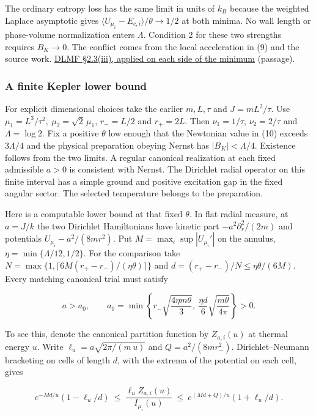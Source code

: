 \documentclass[11pt,a4paper]{article}
\begin{document}
The ordinary entropy loss has the same limit in units of \(k_B\) because
the weighted Laplace asymptotic gives
\(\langle U_{\mu_i}-E_{c,i}\rangle/\theta\to1/2\) at both minima. No
wall length or phase-volume normalization enters \(\Lambda\). Condition
2 for these two strengths requires \(B_K\to0\). The conflict comes from
the local acceleration in (9) and the source work.
\href{https://dlmf.nist.gov/2.3.iii}{DLMF §2.3(iii), applied on each
side of the minimum} (passage).

\subsubsection{A finite Kepler lower
bound}\label{a-finite-kepler-lower-bound}

For explicit dimensional choices take the earlier \(m,L,\tau\) and
\(J=mL^2/\tau\). Use \(\mu_1=L^3/\tau^2,\ \mu_2=\sqrt2\,\mu_1\),
\(r_-=L/2\) and \(r_+=2L\). Then \(\nu_1=1/\tau\), \(\nu_2=2/\tau\) and
\(\Lambda=\log2\). Fix a positive \(\theta\) low enough that the
Newtonian value in (10) exceeds \(3\Lambda/4\) and the physical
preparation obeying Nernst has \(|B_K|<\Lambda/4\). Existence follows
from the two limits. A regular canonical realization at each fixed
admissible \(a>0\) is consistent with Nernst. The Dirichlet radial
operator on this finite interval has a simple ground and positive
excitation gap in the fixed angular sector. The selected temperature
belongs to the preparation.

Here is a computable lower bound at that fixed \(\theta\). In flat
radial measure, at \(a=J/k\) the two Dirichlet Hamiltonians have kinetic
part \(-a^2\partial_r^2/(2m)\) and potentials \(U_{\mu_i}-a^2/(8mr^2)\).
Put \(M=\max_i\sup|U_{\mu_i}'|\) on the annulus,
\(\eta=\min\{\Lambda/12,1/2\}\). For the comparison take
\(N=\max\{1,\lceil 6M(r_+-r_-)/(\eta\theta)\rceil\}\) and
\(d=(r_+-r_-)/N\le\eta\theta/(6M)\). Every matching canonical trial must
satisfy

\[
 a>a_0,\qquad
 a_0=\min\left\{
 r_-\sqrt{\frac{4\eta m\theta}{3}},
 \ \frac{\eta d}{6}\sqrt{\frac{m\theta}{4\pi}}\right\}>0 .         \tag{11}
\]

To see this, denote the canonical partition function by \(Z_{a,i}(u)\)
at thermal energy \(u\). Write \(\ell_u=a\sqrt{2\pi/(m\,u)}\) and
\(Q=a^2/(8mr_-^2)\). Dirichlet--Neumann bracketing on cells of length
\(d\), with the extrema of the potential on each cell, gives

\[
 e^{-Md/u}(1-\ell_u/d)
 \ \le\ \frac{\ell_u Z_{a,i}(u)}{I_{\mu_i}(u)}
 \ \le\ e^{(Md+Q)/u}(1+\ell_u/d).
\]
\end{document}

